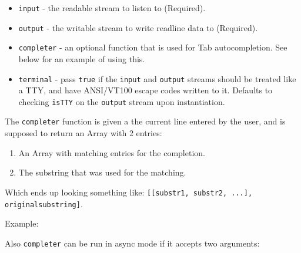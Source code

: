 \begin{itemize}
\item
  \texttt{input} - the readable stream to listen to (Required).
\item
  \texttt{output} - the writable stream to write readline data to
  (Required).
\item
  \texttt{completer} - an optional function that is used for Tab
  autocompletion. See below for an example of using this.
\item
  \texttt{terminal} - pass \texttt{true} if the \texttt{input} and
  \texttt{output} streams should be treated like a TTY, and have
  ANSI/VT100 escape codes written to it. Defaults to checking
  \texttt{isTTY} on the \texttt{output} stream upon instantiation.
\end{itemize}

The \texttt{completer} function is given a the current line entered by
the user, and is supposed to return an Array with 2 entries:

\begin{enumerate}[1.]
\item
  An Array with matching entries for the completion.
\item
  The substring that was used for the matching.
\end{enumerate}

Which ends up looking something like:
\texttt{{[}{[}substr1, substr2, ...{]}, originalsubstring{]}}.

Example:

\begin{Shaded}
\begin{Highlighting}[]
 
   \NormalTok{(}\NormalTok{)}
   \NormalTok{(}  \NormalTok{\})}
   \NormalTok{[} \NormalTok{: completions, line]}
\NormalTok{\}}
\end{Highlighting}
\end{Shaded}

Also \texttt{completer} can be run in async mode if it accepts two
arguments:

